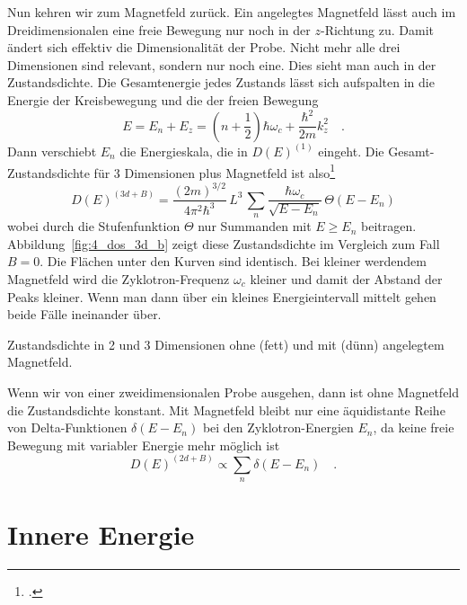 Nun kehren wir zum Magnetfeld zurück. Ein angelegtes Magnetfeld lässt auch im Dreidimensionalen eine freie Bewegung nur noch in der $z$-Richtung zu. Damit ändert sich effektiv die Dimensionalität der Probe. Nicht mehr alle drei Dimensionen sind relevant, sondern nur noch eine. Dies sieht man auch in der Zustandsdichte. Die Gesamtenergie jedes Zustands lässt sich aufspalten in die  Energie der Kreisbewegung und die der freien Bewegung
\begin{equation}
   E = E_n + E_z =  \left(n + \frac{1}{2} \right) \hbar \omega_c +  \frac{\hbar^2}{2m} k_z^2 \quad .
\end{equation}
Dann verschiebt $E_n$ die Energieskala, die in $ D(E)^{(1)}$ eingeht. Die Gesamt-Zustandsdichte für 3 Dimensionen plus Magnetfeld ist also\footcite{Czycholl_theo_FK1}
\begin{equation}
   D(E)^{(3d + B)} = 
    \frac{(2m)^{3/2}}{4 \pi^2 \hbar^3}
    \, L^3  \, \sum_n \frac{\hbar \omega_c}{ \sqrt{E - E_n}} \, \Theta(E-E_n)
\end{equation} 
wobei durch die Stufenfunktion $\Theta$ nur Summanden mit $E \ge E_n$ beitragen. Abbildung~\ref{fig:4_dos_3d_b} zeigt diese Zustandsdichte im Vergleich zum Fall $B=0$. Die Flächen unter den Kurven sind identisch. Bei kleiner werdendem Magnetfeld wird die Zyklotron-Frequenz $\omega_c$ kleiner und damit der Abstand der Peaks kleiner. Wenn man dann über ein kleines Energieintervall mittelt gehen beide Fälle ineinander über.

\begin{marginfigure}
   \caption{Zustandsdichte in 2 und 3 Dimensionen ohne (fett) und mit (dünn) angelegtem Magnetfeld. \label{fig:4_dos_3d_b}}
\end{marginfigure}


Wenn wir von einer zweidimensionalen Probe ausgehen, dann ist ohne Magnetfeld die Zustandsdichte konstant. Mit Magnetfeld bleibt nur eine äquidistante Reihe von Delta-Funktionen $\delta(E-E_n)$ bei den Zyklotron-Energien $E_n$, da keine freie Bewegung mit variabler Energie mehr möglich ist
\begin{equation}
   D(E)^{(2d + B)} \propto \sum_n  \delta(E-E_n) \quad . \label{eq:4_dos_2d_b}
\end{equation} 




\section{Innere Energie} 

